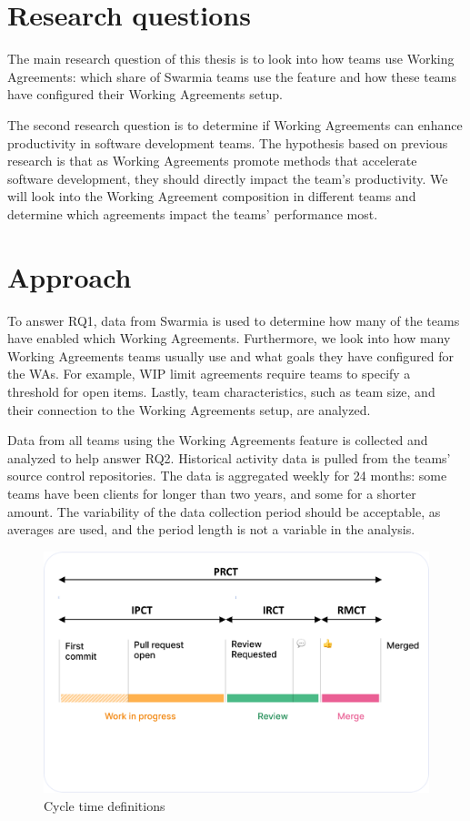 \section{Research questions}

The main research question of this thesis is to look into how teams use Working Agreements: which share of Swarmia teams use the feature and how these teams have configured their Working Agreements setup. 

The second research question is to determine if Working Agreements can enhance productivity in software development teams. The hypothesis based on previous research is that as Working Agreements promote methods that accelerate software development, they should directly impact the team's productivity. We will look into the Working Agreement composition in different teams and determine which agreements impact the teams' performance most. 

\section{Approach}

To answer RQ1, data from Swarmia is used to determine how many of the teams have enabled which Working Agreements. Furthermore, we look into how many Working Agreements teams usually use and what goals they have configured for the WAs. For example, WIP limit agreements require teams to specify a threshold for open items. Lastly, team characteristics, such as team size, and their connection to the Working Agreements setup, are analyzed.

Data from all teams using the Working Agreements feature is collected and analyzed to help answer RQ2. Historical activity data is pulled from the teams' source control repositories. The data is aggregated weekly for 24 months: some teams have been clients for longer than two years, and some for a shorter amount. The variability of the data collection period should be acceptable, as averages are used, and the period length is not a variable in the analysis.

\begin{figure}[h]
    \begin{center}
        \includegraphics[width=13.5cm]{LaTeX/images/cts_defined_arrows.png}
        \caption{Cycle time definitions}
        \label{fig:ctsArrows}
    \end{center}
\end{figure}

